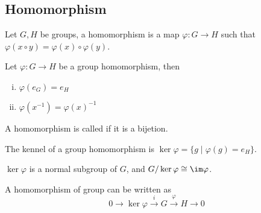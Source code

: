 
\subsection{Homomorphism}
\begin{defi}
Let $G, H$ be groups, a homomorphism is a map $\varphi : G \to H$ such that
$\varphi(x \circ y) = \varphi(x) \circ \varphi(y)$.
\end{defi}

\begin{pro}
Let $\varphi : G \to H$ be a group homomorphism, then 
\begin{enumerate}[i).]
\item $\varphi(e_G) = e_H$
\item $\varphi(x^{-1}) = \varphi(x)^{-1}$
\end{enumerate}
\end{pro}

A homomorphism is called  if it is a bijetion.

\begin{defi}[kernel]
The kennel of a group homomorphism is $\ker \varphi = \{ g \mid \varphi(g) = e_H\}$.
\end{defi}

\begin{thm}
$\ker \varphi$ is a normal subgroup of $G$, and $G / \ker \varphi \cong \im \varphi$.
\end{thm}

A homomorphism of group can be written as 
$$0 \to \ker \varphi \xrightarrow{i} G \xrightarrow{\varphi} H \to 0$$
